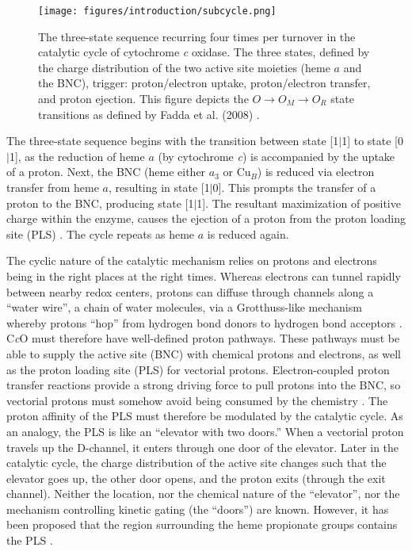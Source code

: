 \begin{figure}[htbp]
\centering
\texttt{[image: figures/introduction/subcycle.png]}
\caption[The three-state sequence recurring four times per turnover in the catalytic cycle of cytochrome \emph{c} oxidase.]{The three-state sequence recurring four times per turnover in the catalytic cycle of cytochrome \emph{c} oxidase. The three states, defined by the charge distribution of the two active site moieties (heme $a$ and the BNC), trigger: proton/electron uptake, proton/electron transfer, and proton ejection. This figure depicts the $O \rightarrow O_M \rightarrow O_R$ state transitions as defined by Fadda et al. (2008) \cite{Fadda:2008p5482}.}
\label{fig:catalytic_subcycle}
\end{figure}

The three-state sequence begins with the transition between state [1$\mid$1] to state [0$\mid$1], as the reduction of heme $a$ (by cytochrome \emph{c}) is accompanied by the uptake of a proton. Next, the BNC (heme either $a_3$ or Cu$_B$) is reduced via electron transfer from heme $a$, resulting in state [1$\mid$0]. This prompts the transfer of a proton to the BNC, producing state [1$\mid$1]. The resultant maximization of positive charge within the enzyme, causes the ejection of a proton from the proton loading site (PLS) \cite{Fadda:2008p5482}. The cycle repeats as heme $a$ is reduced again.

The cyclic nature of the catalytic mechanism relies on protons and electrons being in the right places at the right times. Whereas electrons can tunnel rapidly between nearby redox centers, protons can diffuse through channels along a ``water wire'', a chain of water molecules, via a Grotthuss-like mechanism whereby protons ``hop'' from hydrogen bond donors to hydrogen bond acceptors \cite{Pomes:1996p5488}. C\emph{c}O must therefore have well-defined proton pathways. These pathways must be able to supply the active site (BNC) with chemical protons and electrons, as well as the proton loading site (PLS) for vectorial protons. Electron-coupled proton transfer reactions provide a strong driving force to pull protons into the BNC, so vectorial protons must somehow avoid being consumed by the chemistry \cite{Gennis:2004p10239}. The proton affinity of the PLS must therefore be modulated by the catalytic cycle. As an analogy, the PLS is like an ``elevator with two doors.'' When a vectorial proton travels up the D-channel, it enters through one door of the elevator. Later in the catalytic cycle, the charge distribution of the active site changes such that the elevator goes up, the other door opens, and the proton exits (through the exit channel). Neither the location, nor the chemical nature of the ``elevator'', nor the mechanism controlling kinetic gating (the ``doors'') are known. However, it has been proposed that the region surrounding the heme propionate groups contains the PLS \cite{Behr:2000p5260,Qian:2004p10319,Mills:2005p5442}.

